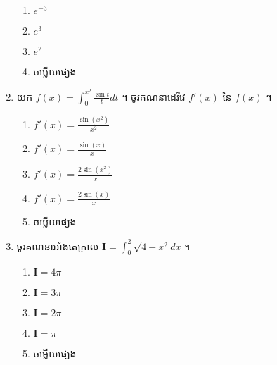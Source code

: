 \documentclass[12pt, a4paper]{article}
\begin{document}
\begin{enumerate}[m]
\begin{enumerate}[k,5]
		\item $e^{-3}$
		\item $e^{3}$
		\item $e^{2}$
		\item ចម្លើយផ្សេង
	\end{enumerate}
	{\color{blue}\hrulefill}
	\item យក $f(x)=\int_{0}^{x^2}\frac{\sin t}{t}dt$ ។ ចូរគណនាដេរីវេ $f'(x)$ នៃ $f(x)$ ។
	\begin{enumerate}[k,3]
		\item $f'(x)=\frac{\sin\left(x^2\right)}{x^2}$
		\item $f'(x)=\frac{\sin\left(x\right)}{x}$
		\item $f'(x)=\frac{2\sin\left(x^2\right)}{x}$
		\item $f'(x)=\frac{2\sin\left(x\right)}{x}$
		\item ចម្លើយផ្សេង
	\end{enumerate}
	{\color{blue}\hrulefill}
	\item ចូរគណនាអាំងតេក្រាល $\mathbf{I}=\int_{0}^{2}\sqrt{4-x^2}dx$ ។
	\begin{enumerate}[k,5]
		\item $\mathbf{I}=4\pi$
		\item $\mathbf{I}=3\pi$
		\item $\mathbf{I}=2\pi$
		\item $\mathbf{I}=\pi$
		\item ចម្លើយផ្សេង
	\end{enumerate}
	{\color{blue}\hrulefill}
\end{enumerate}
\makeads
\newpage
\maketitle\koc
{\color{blue}\hrulefill}
\end{document}
